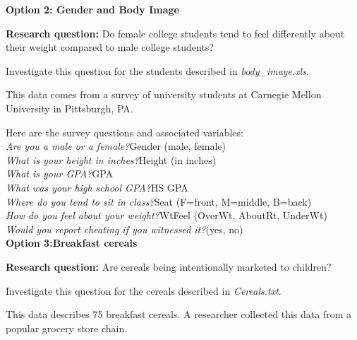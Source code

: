 \textbf{Option 2: Gender and Body Image} 

\textbf{Research question:} Do female college students tend to feel differently about their weight compared to male college students? 

Investigate this question for the students described in \emph{body\_image.xls}. 

This data comes from a survey of university students at Carnegie Mellon University in Pittsburgh, PA.

Here are the survey questions and associated variables: \\
\emph{Are you a male or a female?}\quad Gender (male, female)\\
\emph{What is your height in inches?}\quad Height (in inches)\\
\emph{What is your GPA?}\quad GPA\\
\emph{What was your high school GPA?}\quad HS GPA\\
\emph{Where do you tend to sit in class?}\quad Seat (F=front, M=middle, B=back)\\
\emph{How do you feel about your weight?}\quad WtFeel (OverWt, AboutRt, UnderWt)\\
\emph{Would you report cheating if you witnessed it?}\quad (yes, no)\\

\newpage
\textbf{Option 3:Breakfast cereals} 

\textbf{Research question:} Are cereals being intentionally marketed to children?

Investigate this question for the cereals described in \emph{Cereals.txt}. 

This data describes 75 breakfast cereals. A researcher collected this data from a popular grocery store chain.

